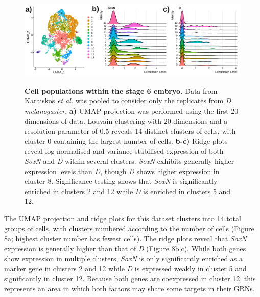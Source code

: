 \documentclass[withindex,glossary]{cam-thesis}
\begin{document}
\setcounter{figure}{8-1}
\begin{figure}[htbp]
\centering
\includegraphics[width=\textwidth]{figs/Fig8 embryonic UMAP and ridges.png}
\label{fig8}
\caption{\textbf{Cell populations within the stage 6 embryo.} Data from Karaiskos \emph{et al.} was pooled to consider only the replicates from \emph{D. melanogaster}. \textbf{a)} UMAP projection was performed using the first 20 dimensions of data. Louvain clustering with 20 dimensions and a resolution parameter of 0.5 reveals 14 distinct clusters of cells, with cluster 0 containing the largest number of cells. \textbf{b-c)} Ridge plots reveal log-normalised and variance-stabilised expression of both \emph{SoxN} and \emph{D} within several clusters. \emph{SoxN} exhibits generally higher expression levels than \emph{D}, though \emph{D} shows higher expression in cluster 8. Significance testing shows that \emph{SoxN} is significantly enriched in clusters 2 and 12 while \emph{D} is enriched in clusters 5 and 12. }
\end{figure}

The UMAP projection and ridge plots for this dataset clusters into 14
total groups of cells, with clusters numbered according to the number of
cells (Figure 8a; highest cluster number has fewest cells). The ridge
plots reveal that \emph{SoxN} expression is generally higher than that
of \emph{D} (Figure 8b,c). While both genes show expression in multiple
clusters, \emph{SoxN} is only significantly enriched as a marker gene in
clusters 2 and 12 while \emph{D} is expressed weakly in cluster 5 and
significantly in cluster 12. Because both genes are coexpressed in
cluster 12, this represents an area in which both factors may share some
targets in their GRNs.
\end{document}
